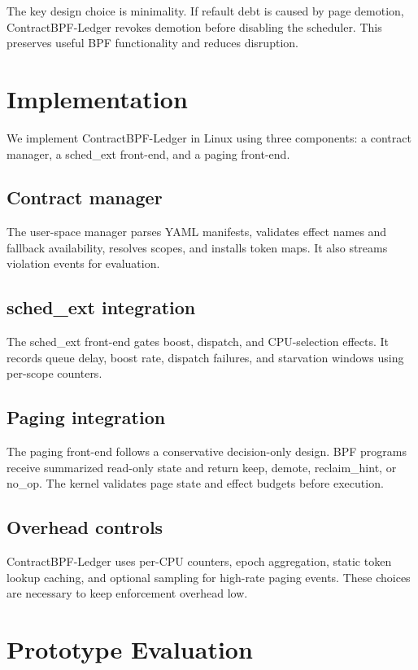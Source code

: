 \documentclass[letterpaper,twocolumn,10pt]{article}
\newcommand{\sys}{ContractBPF-Ledger\xspace}
\begin{document}
The key design choice is minimality. If refault debt is caused by page demotion, \sys revokes demotion before disabling the scheduler. This preserves useful BPF functionality and reduces disruption.

\section{Implementation}

We implement \sys in Linux using three components: a contract manager, a sched\_ext front-end, and a paging front-end.

\subsection{Contract manager}

The user-space manager parses YAML manifests, validates effect names and fallback availability, resolves scopes, and installs token maps. It also streams violation events for evaluation.

\subsection{sched\_ext integration}

The sched\_ext front-end gates boost, dispatch, and CPU-selection effects. It records queue delay, boost rate, dispatch failures, and starvation windows using per-scope counters.

\subsection{Paging integration}

The paging front-end follows a conservative decision-only design. BPF programs receive summarized read-only state and return keep, demote, reclaim\_hint, or no\_op. The kernel validates page state and effect budgets before execution.

\subsection{Overhead controls}

\sys uses per-CPU counters, epoch aggregation, static token lookup caching, and optional sampling for high-rate paging events. These choices are necessary to keep enforcement overhead low.

\section{Prototype Evaluation}
\end{document}

